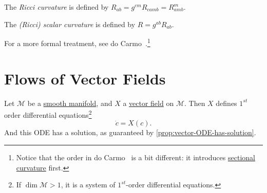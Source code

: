 \begin{definition}\label{def:Ricci-curvature}
	The \emph{Ricci curvature} is defined by \(R_{ab} = g^{cm}R_{c a m b} = R^m_{amb}\).
\end{definition}

\begin{definition}\label{def:Ricci-scalar-curvature}
	The \emph{(Ricci) scalar curvature} is defined by \(R = g^{ab}R_{ab}\).
\end{definition}

\begin{note}
	For a more formal treatment, see do Carmo~\cite[]{flaherty2013riemannian}.\footnote{Notice that the order in do Carmo~\cite{flaherty2013riemannian} is a bit different: it introduces \hyperref[def:sectional-curvature]{sectional curvature} first.}
\end{note}

\section{Flows of Vector Fields}
Let \(\mathcal{M} \) be a \hyperref[def:smooth-manifold]{smooth manifold}, and \(X\) a \hyperref[def:vector-field]{vector field} on \(\mathcal{M} \). Then \(X\) defines \(1^{st}\) order differential equations\footnote{If \(\dim \mathcal{M} > 1\), it is a system of \(1^{st} \)-order differential equations.}
\[
	\dot{c} = X(c).
\]
And this ODE has a solution, as guaranteed by \autoref{prop:vector-ODE-has-solution}.

